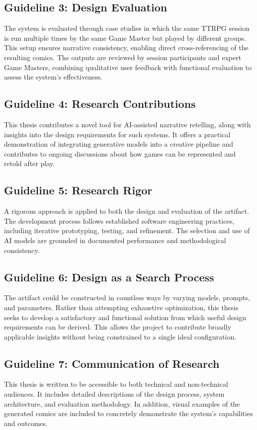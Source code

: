 \subsection*{Guideline 3: Design Evaluation}
The system is evaluated through case studies in which the same TTRPG session is run multiple times by the same Game Master but played by different groups. This setup ensures narrative consistency, enabling direct cross-referencing of the resulting comics. The outputs are reviewed by session participants and expert Game Masters, combining qualitative user feedback with functional evaluation to assess the system's effectiveness.

\subsection*{Guideline 4: Research Contributions}
This thesis contributes a novel tool for AI-assisted narrative retelling, along with insights into the design requirements for such systems. It offers a practical demonstration of integrating generative models into a creative pipeline and contributes to ongoing discussions about how games can be represented and retold after play.

\subsection*{Guideline 5: Research Rigor}
A rigorous approach is applied to both the design and evaluation of the artifact. The development process follows established software engineering practices, including iterative prototyping, testing, and refinement. The selection and use of AI models are grounded in documented performance and methodological consistency.

\subsection*{Guideline 6: Design as a Search Process}
The artifact could be constructed in countless ways by varying models, prompts, and parameters. Rather than attempting exhaustive optimization, this thesis seeks to develop a satisfactory and functional solution from which useful design requirements can be derived. This allows the project to contribute broadly applicable insights without being constrained to a single ideal configuration.

\subsection*{Guideline 7: Communication of Research}
This thesis is written to be accessible to both technical and non-technical audiences. It includes detailed descriptions of the design process, system architecture, and evaluation methodology. In addition, visual examples of the generated comics are included to concretely demonstrate the system's capabilities and outcomes.

